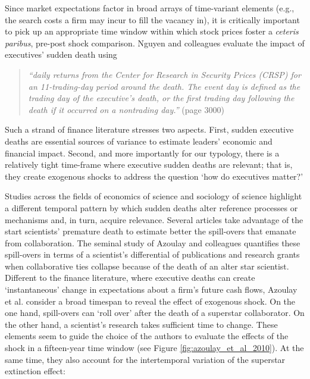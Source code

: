 \begin{refsection}
Since market expectations factor in broad arrays of time-variant elements (e.g.,
the search costs a firm may incur to fill the vacancy in), it is critically
important to pick up an appropriate time window within which stock prices foster
a \textit{ceteris paribus}, pre-post shock comparison. Nguyen and colleagues
\autocite*[][]{nguyen_et_al_2014} evaluate the impact of executives' sudden
death using 

\begin{quote}
  \textit{
    ``daily returns from the Center for Research in Security Prices (CRSP) for
    an 11-trading-day period around the death. The event day is defined as the
    trading day of the executive's death, or the first trading day following the
    death if it occurred on a nontrading day.''
  }
  (page 3000)
\end{quote}

Such a strand of finance literature stresses two aspects. First, sudden executive
deaths are essential sources of variance to estimate leaders' economic and 
financial impact.  Second, and more importantly for our typology,
there is a relatively tight time-frame where executive sudden deaths are
relevant; that is, they create exogenous shocks to address the question 
`how do executives matter?'

Studies across the fields of economics of science and sociology of science highlight a
different temporal pattern by which sudden deaths alter reference  processes or
mechanisms and, in turn, acquire relevance. Several articles
\autocites[e.g.,][]{azoulay_et_al_2019_b,azoulay_et_al_2019_a,khanna_et_al_2021,
aizenam_kletzer_2011,azoulay_et_al_2010,oettl_2012} take advantage of the 
start scientists' premature death to estimate better the spill-overs 
that emanate from collaboration. The seminal study of Azoulay and colleagues 
\autocite*{azoulay_et_al_2010} quantifies these spill-overs in terms of 
a scientist's differential of publications and research grants 
when collaborative ties collapse because of the death of an alter star 
scientist. Different to the finance literature, where executive deaths 
can create `instantaneous' change in expectations about a firm's 
future cash flows, Azoulay et al. \autocite{azoulay_et_al_2010}
consider a broad timespan to reveal the effect of exogenous shock. On the one 
hand, spill-overs can `roll over' after the death of a superstar collaborator. 
On the other hand, a scientist's research takes sufficient time to change. 
These elements seem to guide the choice of the authors to 
evaluate the effects of the shock in a fifteen-year time window
(see Figure \ref{fig:azoulay_et_al_2010}). At the same
time, they also account for the intertemporal variation of the superstar 
extinction effect:
 

\end{refsection}
